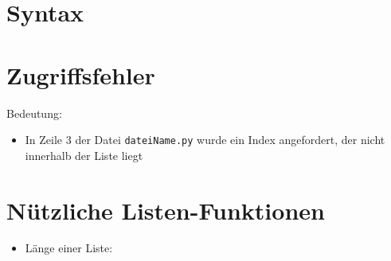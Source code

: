 \section{Syntax}
\begin{frame}
    \slidehead
\end{frame}

\section{Zugriffsfehler}
\begin{frame}
    \slidehead
    Bedeutung:
    \begin{itemize}
        \item In Zeile 3 der Datei \texttt{dateiName.py} wurde ein Index angefordert, der nicht innerhalb der Liste liegt
    \end{itemize}

\end{frame}


%
\subtitle{Listen}
\subtitle{Kapitel 5: ganz viele Variablen in einer}

\section{Nützliche Listen-Funktionen}
\begin{frame}
    \slidehead
    \begin{itemize}
        \item Länge einer Liste:
    \end{itemize}
\end{frame}

